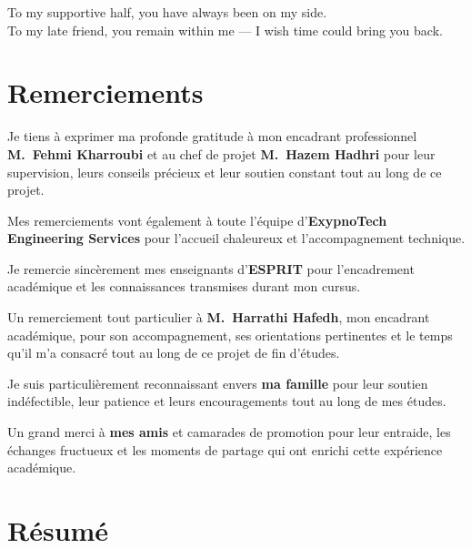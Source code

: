 \documentclass[12pt,a4paper]{report}
\begin{document}
\begin{center}
\begin{minipage}{0.85\textwidth}
\centering
\itshape

To my supportive half, you have always been on my side.\\[8pt]
To my late friend, you remain within me — I wish time could bring you back.

\end{minipage}
\end{center}

\chapter*{Remerciements}

Je tiens à exprimer ma profonde gratitude à mon encadrant professionnel
\textbf{M.~Fehmi Kharroubi} et au chef de projet \textbf{M.~Hazem Hadhri}
pour leur supervision, leurs conseils précieux et leur soutien constant tout
au long de ce projet.

Mes remerciements vont également à toute l'équipe d'\textbf{ExypnoTech
Engineering Services} pour l'accueil chaleureux et l'accompagnement technique.

Je remercie sincèrement mes enseignants d'\textbf{ESPRIT} pour
l'encadrement académique et les connaissances transmises durant mon cursus.

Un remerciement tout particulier à \textbf{M.~Harrathi Hafedh}, mon encadrant
académique, pour son accompagnement, ses orientations pertinentes et le temps
qu'il m'a consacré tout au long de ce projet de fin d'études.

Je suis particulièrement reconnaissant envers \textbf{ma famille} pour leur
soutien indéfectible, leur patience et leurs encouragements tout au long de
mes études.

Un grand merci à \textbf{mes amis} et camarades de promotion pour leur
entraide, les échanges fructueux et les moments de partage qui ont enrichi
cette expérience académique.

\chapter*{Résumé}
\end{document}
